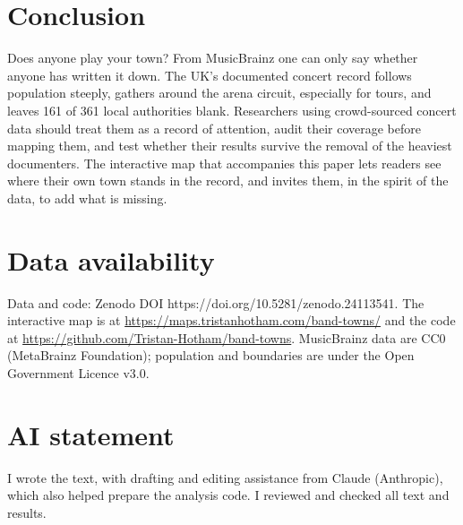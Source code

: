 \documentclass[11pt,a4paper]{article}
\begin{document}
\section{Conclusion}\label{sec:concl}
Does anyone play your town? From MusicBrainz one can only say whether anyone has written it down. The UK's documented concert record follows population steeply, gathers around the arena circuit, especially for tours, and leaves 161 of 361 local authorities blank. Researchers using crowd-sourced concert data should treat them as a record of attention, audit their coverage before mapping them, and test whether their results survive the removal of the heaviest documenters. The interactive map that accompanies this paper lets readers see where their own town stands in the record, and invites them, in the spirit of the data, to add what is missing.

\section*{Data availability}
Data and code: Zenodo DOI https://doi.org/10.5281/zenodo.24113541. The interactive map is at \url{https://maps.tristanhotham.com/band-towns/} and the code at \url{https://github.com/Tristan-Hotham/band-towns}. MusicBrainz data are CC0 (MetaBrainz Foundation); population and boundaries are under the Open Government Licence v3.0.

\section*{AI statement}
I wrote the text, with drafting and editing assistance from Claude (Anthropic), which also helped prepare the analysis code. I reviewed and checked all text and results.
\end{document}

